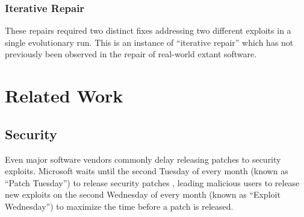 \documentclass{sigcomm-alternate}
\begin{document}
\subsubsection{Iterative Repair}
\label{iterative-repair}
These repairs required two distinct fixes addressing two different
exploits in a single evolutionary run.  This is an instance of
``iterative repair'' which has not previously been observed in the
repair of real-world extant software.


\section{Related Work}
\label{sec-5}
\subsection{Security}
\label{sec-5-1}

Even major software vendors commonly delay releasing patches to
security exploits.  Microsoft waits until the second Tuesday of every
month (known as ``Patch Tuesday'') to release security patches
\cite{lemos2003microsoft}, leading malicious users to release new
exploits on the second Wednesday of every month (known as ``Exploit
Wednesday'') to maximize the time before a patch is released.
\end{document}
